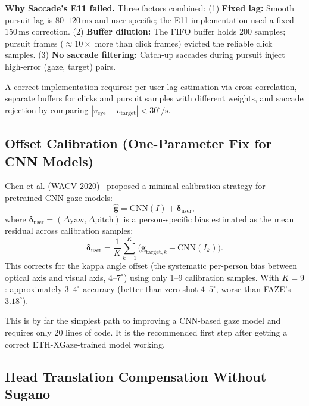 \documentclass[11pt,a4paper]{article}
\begin{document}
\textbf{Why Saccade's E11 failed.}
Three factors combined:
(1) \textbf{Fixed lag:} Smooth pursuit lag is $80$--$120\,\text{ms}$ and user-specific; the E11 implementation used a fixed $150\,\text{ms}$ correction.
(2) \textbf{Buffer dilution:} The FIFO buffer holds 200 samples; pursuit frames ($\approx 10\times$ more than click frames) evicted the reliable click samples.
(3) \textbf{No saccade filtering:} Catch-up saccades during pursuit inject high-error (gaze, target) pairs.

A correct implementation requires: per-user lag estimation via cross-correlation, separate buffers for clicks and pursuit samples with different weights, and saccade rejection by comparing $|v_{\text{eye}} - v_{\text{target}}| < 30^\circ/\text{s}$.

\subsection{Offset Calibration (One-Parameter Fix for CNN Models)}

Chen et al. (WACV 2020)~\cite{chen2020offset} proposed a minimal calibration strategy for pretrained CNN gaze models:
\begin{equation}
  \hat{\mathbf{g}} = \text{CNN}(I) + \boldsymbol{\delta}_{\text{user}},
\end{equation}
where $\boldsymbol{\delta}_{\text{user}} = (\Delta\text{yaw}, \Delta\text{pitch})$ is a person-specific bias estimated as the mean residual across calibration samples:
\begin{equation}
  \boldsymbol{\delta}_{\text{user}} = \frac{1}{K}\sum_{k=1}^{K}\bigl(\mathbf{g}_{\text{target},k} - \text{CNN}(I_k)\bigr).
\end{equation}
This corrects for the kappa angle offset (the systematic per-person bias between optical axis and visual axis, $4$--$7^\circ$) using only 1--9 calibration samples.
With $K=9$: approximately $3$--$4^\circ$ accuracy (better than zero-shot $4$--$5^\circ$, worse than FAZE's $3.18^\circ$).

This is by far the simplest path to improving a CNN-based gaze model and requires only 20 lines of code. It is the recommended first step after getting a correct ETH-XGaze-trained model working.

\subsection{Head Translation Compensation Without Sugano}
\end{document}
